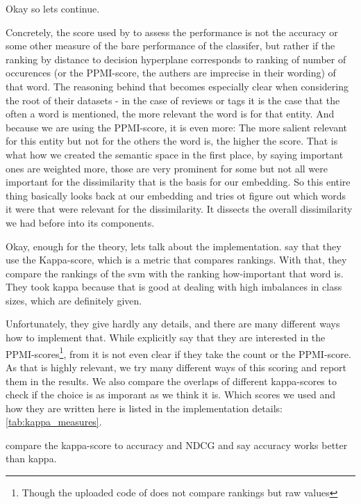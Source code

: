 Okay so lets continue.

Concretely, the score used by \cite{Derrac2015} to assess the performance is not the accuracy or some other measure of the bare performance of the classifer, but rather if the ranking by distance to decision hyperplane corresponds to ranking of number of occurences (or the PPMI-score, the authers are imprecise in their wording) of that word.
The reasoning behind that becomes especially clear when considering the root of their datasets - in the case of reviews or tags it is the case that the often a word is mentioned, the more relevant the word is for that entity. And because we are using the PPMI-score, it is even more: The more salient relevant for this entity but not for the others the word is, the higher the score. That is what how we created the semantic space in the first place, by saying important ones are weighted more, those are very prominent for some but not all were important for the dissimilarity that is the basis for our embedding. So this entire thing basically looks back at our embedding and tries ot figure out which words it were that were relevant for the dissimilarity. It dissects the overall dissimilarity we had before into its components.

Okay, enough for the theory, lets talk about the implementation. \cite{Derrac2015} say that they use the Kappa-score, which is a metric that compares rankings. With that, they compare the rankings of the svm with the ranking how-important that word is. They took kappa because that is good at dealing with high imbalances in class sizes, which are definitely given.

Unfortunately, they give hardly any details, and there are many different ways how to implement that. While \cite{Ager2018,Alshaikh2020} explicitly say that they are interested in the PPMI-scores\footnote{Though the uploaded code of \cite{Alshaikh2020} does not compare rankings but raw values}, from \cite{Derrac2015} it is not even clear if they take the count or the PPMI-score. As that is highly relevant, we try many different ways of this scoring and report them in the results. We also compare the overlaps of different kappa-scores to check if the choice is as imporant as we think it is. Which scores we used and how they are written here is listed in the implementation details: \autoref{tab:kappa_measures}.

\textcite{Ager2018} compare the kappa-score to accuracy and NDCG and say accuracy works better than kappa.

